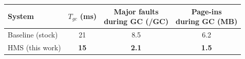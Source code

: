 \begin{tabular}{lccc}
\toprule
System & \makecell{$T_{gc}$\\(ms)} & \makecell{Major faults\\during GC (/GC)} & \makecell{Page-ins\\during GC (MB)} \\
\midrule
Baseline (stock) & 21 & 8.5 & 6.2 \\
HMS (this work) & \textbf{15} & \textbf{2.1} & \textbf{1.5} \\
\bottomrule
\end{tabular}
